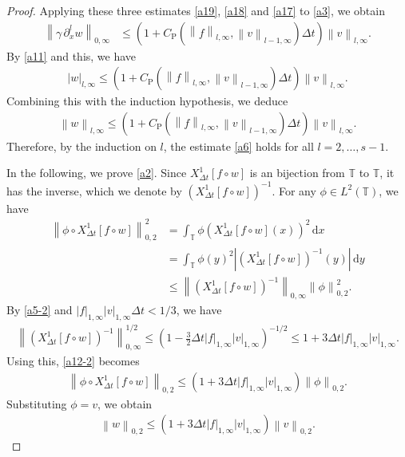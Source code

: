 \documentclass[10pt,a4paper,tbtags,leqno]{amsart}
\theoremstyle{definition}
\numberwithin{equation}{section}
\def\norm#1#2{\left\|#2\right\|_{#1}}
\def\snorm#1#2{\left|#2\right|_{#1}}
\begin{document}
\begin{proof}
  Applying these three estimates \eqref{a19}, \eqref{a18} and \eqref{a17} to \eqref{a3}, we obtain 
  \begin{align} 
    \norm{0, \infty}{\gamma \, \partial_x^l w} & \leq  \left(1 + C_{\mathrm{P}} (\norm{l, \infty}{f}, \norm{l - 1, \infty}{v}) \Delta t\right) \norm{l, \infty}{v}. 
  \end{align} 
  By \eqref{a11} and this, we have 
  \begin{align} 
    \snorm{l, \infty}{w} \leq  (1 + C_{\mathrm{P}} (\norm{l, \infty}{f}, \norm{l - 1, \infty}{v}) \Delta t) \norm{l, \infty}{v}. 
  \end{align} 
  Combining this with the induction hypothesis, we deduce
  \begin{align}
    \norm{l, \infty}{w} \leq (1 + C_{\mathrm{P}} (\norm{l, \infty}{f}, \norm{l - 1, \infty}{v}) \Delta t) \norm{l, \infty}{v}. 
  \end{align} 
  Therefore, by the induction on $ l $, the estimate \eqref{a6} holds for all $ l = 2,\ldots, s - 1 $. 

  In the following, we prove \eqref{a2}. 
  Since $ {X_{\Delta t}^1} [f \circ w] $ is an bijection from $ \mathbb{T} $ to $ \mathbb{T} $, it has the inverse, which we denote by $  ({X_{\Delta t}^1} [f \circ w])^{-1} $. For any $ \phi \in L^2(\mathbb{T}) $, we have 
  \begin{align}
    \norm{0, 2}{\phi \circ {X_{\Delta t}^1} [f \circ w]}^2 & = \int_{\mathbb{T}} \phi ({X_{\Delta t}^1} [f \circ w] (x))^2 \, \mathrm{d} x \\ 
    & = \int_{\mathbb{T}} \phi (y)^2 | ({X_{\Delta t}^1} [f \circ w])^{-1} (y) | \,\mathrm{d} y \\ 
    & \leq \norm{0, \infty}{({X_{\Delta t}^1} [f \circ w])^{-1}} \norm{0, 2}{\phi}^2. \label{a12-2}
  \end{align} 
  By \eqref{a5-2} and $ \snorm{1,\infty}{f}\snorm{1,\infty}{v}\Delta t < 1/3 $, we have 
  \begin{align}
    \norm{0, \infty}{({X_{\Delta t}^1} [f \circ w])^{-1}}^{1 / 2} \leq \left(1 - \frac{3}{2} \Delta t \snorm{1,\infty}{f}\snorm{1,\infty}{v}\right)^{-1/2} \leq 1 + 3 \Delta t \snorm{1,\infty}{f}\snorm{1,\infty}{v}. 
  \end{align}
  Using this, \eqref{a12-2} becomes 
  \begin{align}
    \norm{0, 2}{\phi \circ {X_{\Delta t}^1} [f \circ w]} \leq (1 + 3 \Delta t \snorm{1,\infty}{f}\snorm{1,\infty}{v}) \norm{0, 2}{\phi}. 
    \label{a12}
  \end{align}
  Substituting $ \phi = v $, we obtain 
  \begin{align}
    \norm{0, 2}{w} \leq (1 + 3 \Delta t \snorm{1,\infty}{f}\snorm{1,\infty}{v}) \norm{0, 2}{v}. \label{a15} 
  \end{align} 


\end{proof}
\end{document}
